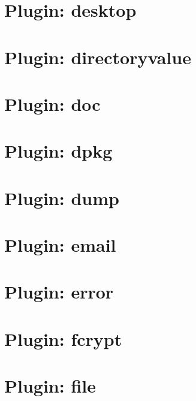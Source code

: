 \let\mypdfximage\pdfximage\def\pdfximage{\immediate\mypdfximage}\documentclass[twoside]{book}
\newcommand{\+}{\discretionary{\mbox{\scriptsize$\hookleftarrow$}}{}{}}
\begin{document}
\chapter{Plugin\+: desktop}
\label{md_src_plugins_desktop_README}

\chapter{Plugin\+: directoryvalue}
\label{md_src_plugins_directoryvalue_README}

\chapter{Plugin\+: doc}
\label{md_src_plugins_doc_README}

\chapter{Plugin\+: dpkg}
\label{md_src_plugins_dpkg_README}

\chapter{Plugin\+: dump}
\label{md_src_plugins_dump_README}

\chapter{Plugin\+: email}
\label{md_src_plugins_email_README}

\chapter{Plugin\+: error}
\label{md_src_plugins_error_README}

\chapter{Plugin\+: fcrypt}
\label{md_src_plugins_fcrypt_README}

\chapter{Plugin\+: file}
\label{md_src_plugins_file_README}

\end{document}
